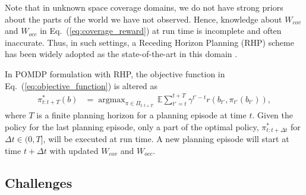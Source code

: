 \documentclass[letterpaper]{article} %
\newcommand{\phdone}[1]{} %
\newcommand{\argmax}{\mathop{\mathrm{argmax}}}
\begin{document}
\phdone{Receding Horizon Planning}
Note that in unknown space coverage domains, we do not have strong priors about the parts of the world we have not observed. Hence, knowledge about $W_{cov}$ and $W_{occ}$ in Eq.~(\ref{eq:coverage_reward}) at run time is incomplete and often inaccurate.
%
Thus, in such settings, a Receding Horizon Planning (RHP) scheme has been widely adopted as the state-of-the-art in this domain \cite{bircher2016receding}.

\phdone{RHP Objective Function}
In POMDP formulation with RHP, the objective function in Eq.~(\ref{eq:objective_function}) is altered as
\begin{align}
  \pi_{t:t+T}^*(b) &= \argmax_{\pi \in \Pi_{t:t+T}} \, \mathbb{E} \sum_{t'=t}^{t+T} \gamma^{t'-t} r(b_{t'}, \pi_{t'}(b_{t'})),
  \label{eq:receding_objective_function}
\end{align}
where $T$ is a finite planning horizon for a planning episode at time $t$.
Given the policy for the last planning episode, only a part of the optimal policy, $\pi^*_{t:t+\Delta t}$ for $\Delta t \in (0, T]$, will be executed at run time. A new planning episode will start at time $t+\Delta t$ with updated $W_{cov}$ and $W_{occ}$.



\subsection{Challenges} \label{ssec:challenges}

    
\end{document}
